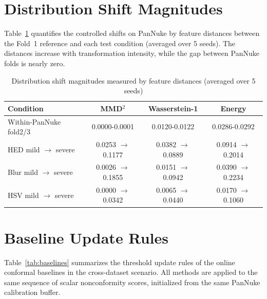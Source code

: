 \documentclass[smallextended,natbib]{svjour3}
\begin{document}
\section{Distribution Shift Magnitudes}\label{secA:shift}

Table~\ref{tab:shift} quantifies the controlled shifts on PanNuke by feature
distances between the Fold~1 reference and each test condition (averaged over 5
seeds). The distances increase with transformation intensity, while the gap between
PanNuke folds is nearly zero.
\begin{table}[htbp]
\caption{Distribution shift magnitudes measured by feature distances (averaged over
5 seeds)}
\label{tab:shift}
\centering
\begin{tabular}{@{}lccc@{}}
\toprule
Condition & MMD$^2$ & Wasserstein-1 & Energy \\
\midrule
Within-PanNuke fold2/3
& 0.0000-0.0001 & 0.0120-0.0122 & 0.0286-0.0292 \\
HED mild $\to$ severe
& 0.0253 $\to$ 0.1177 & 0.0382 $\to$ 0.0889 & 0.0914 $\to$ 0.2014 \\
Blur mild $\to$ severe
& 0.0026 $\to$ 0.1855 & 0.0151 $\to$ 0.0942 & 0.0390 $\to$ 0.2234 \\
HSV mild $\to$ severe
& 0.0000 $\to$ 0.0342 & 0.0065 $\to$ 0.0440 & 0.0170 $\to$ 0.1060 \\
\bottomrule
\end{tabular}
\end{table}

\section{Baseline Update Rules}\label{secA:baselines}

Table~\ref{tab:baselines} summarizes the threshold update rules of the online
conformal baselines in the cross-dataset scenario. All methods are applied to the
same sequence of scalar nonconformity scores, initialized from the same PanNuke
calibration buffer.
\end{document}
